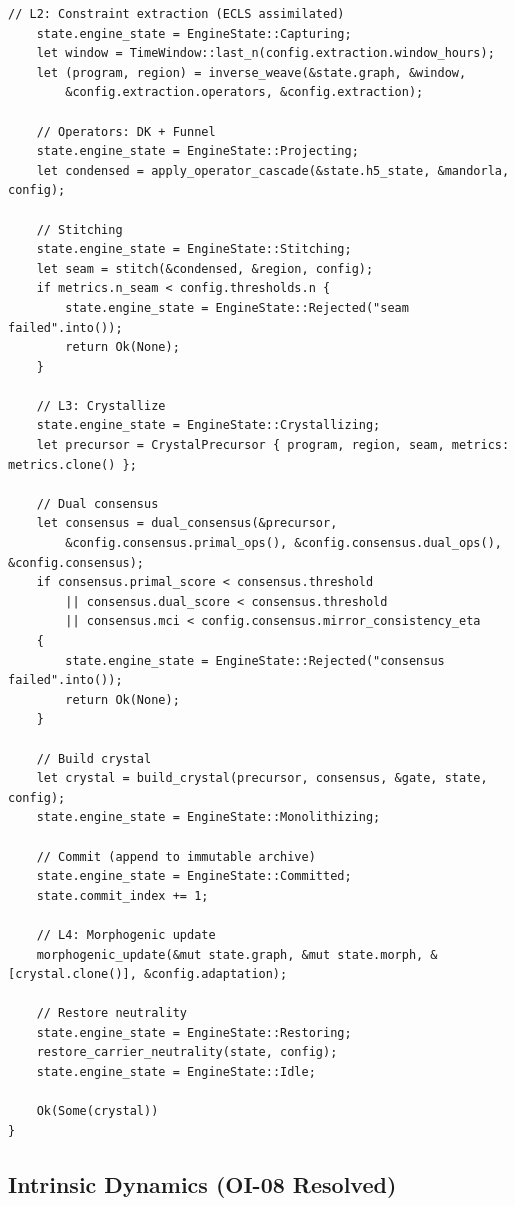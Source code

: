 \documentclass[10pt,a4paper]{article}
\theoremstyle{definition}\newtheorem{definition}{Def}[section]
\theoremstyle{plain}\newtheorem{theorem}{Thm}[section]
\begin{document}
\begin{lstlisting}[style=rust]
    // L2: Constraint extraction (ECLS assimilated)
    state.engine_state = EngineState::Capturing;
    let window = TimeWindow::last_n(config.extraction.window_hours);
    let (program, region) = inverse_weave(&state.graph, &window,
        &config.extraction.operators, &config.extraction);

    // Operators: DK + Funnel
    state.engine_state = EngineState::Projecting;
    let condensed = apply_operator_cascade(&state.h5_state, &mandorla, config);

    // Stitching
    state.engine_state = EngineState::Stitching;
    let seam = stitch(&condensed, &region, config);
    if metrics.n_seam < config.thresholds.n {
        state.engine_state = EngineState::Rejected("seam failed".into());
        return Ok(None);
    }

    // L3: Crystallize
    state.engine_state = EngineState::Crystallizing;
    let precursor = CrystalPrecursor { program, region, seam, metrics: metrics.clone() };

    // Dual consensus
    let consensus = dual_consensus(&precursor,
        &config.consensus.primal_ops(), &config.consensus.dual_ops(), &config.consensus);
    if consensus.primal_score < consensus.threshold
        || consensus.dual_score < consensus.threshold
        || consensus.mci < config.consensus.mirror_consistency_eta
    {
        state.engine_state = EngineState::Rejected("consensus failed".into());
        return Ok(None);
    }

    // Build crystal
    let crystal = build_crystal(precursor, consensus, &gate, state, config);
    state.engine_state = EngineState::Monolithizing;

    // Commit (append to immutable archive)
    state.engine_state = EngineState::Committed;
    state.commit_index += 1;

    // L4: Morphogenic update
    morphogenic_update(&mut state.graph, &mut state.morph, &[crystal.clone()], &config.adaptation);

    // Restore neutrality
    state.engine_state = EngineState::Restoring;
    restore_carrier_neutrality(state, config);
    state.engine_state = EngineState::Idle;

    Ok(Some(crystal))
}
\end{lstlisting}

\subsection{Intrinsic Dynamics (OI-08 Resolved)}
\end{document}

